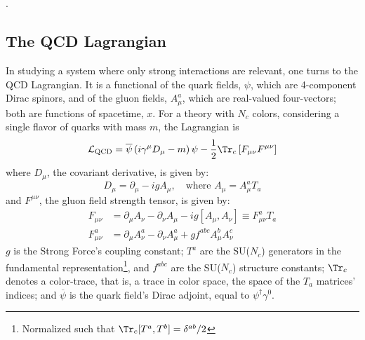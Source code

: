 \chapter{}

.\section{The QCD Lagrangian}

In studying a system where only strong interactions are relevant, one turns to the QCD Lagrangian. It is a functional of the quark fields, $\psi$, which are 4-component Dirac spinors, and of the gluon fields, $A^a_\mu$, which are real-valued four-vectors; both are functions of spacetime, $x$. For a theory with $N_c$ colors, considering a single flavor of quarks with mass $m$,
 the Lagrangian is
\begin{equation}
	\mathcal{L}_\text{QCD} = \overline{\psi} \left(i \gamma^\mu D_\mu - m \right) \psi - \frac{1}{2} \Tr_c \left[ F_{\mu \nu} F^{\mu \nu} \right] %
	\label{eq:QCD_Lagrangian}
\end{equation}
where $D_\mu$, the covariant derivative, is given by:
\begin{equation}
	D_\mu =  \partial_\mu - i g A_\mu, \quad \text{where }  A_\mu = A_\mu^a T_a
\end{equation}
and $F^{\mu \nu}$, the gluon field strength tensor, is given by:
\begin{equation}
\begin{split}
	F_{\mu \nu} & = \partial_\mu A_\nu - \partial_\nu A_\mu - ig [A_\mu, A_\nu] \equiv F_{\mu \nu}^a T_a\\
	F_{\mu \nu}^a & = \partial_\mu A_\nu^a - \partial_\nu A_\mu^a + g f^{a b c} A^b_\mu A^c_\nu 
\end{split}
\end{equation}
$g$ is the Strong Force's coupling constant; $T^a$ are the SU($N_c$) generators in the fundamental representation\footnote{Normalized such that $\Tr_c [T^a, T^b] = \delta^{ab}/2$}, and $f^{abc}$ are the SU($N_c$) structure constants; $\Tr_c$ denotes a color-trace, that is, a trace in color space, the space of the $T_a$ matrices' indices; and $\overline{\psi}$ is the quark field's Dirac adjoint, equal to $ \psi^\dagger \gamma^0$.

